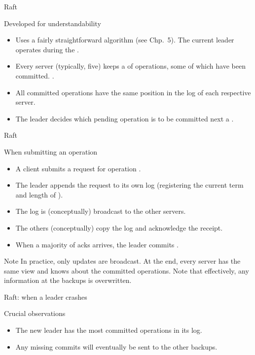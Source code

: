 \begin{slide}{Raft}
  \begin{block}{Developed for understandability}
    \begin{itemize}
    \item Uses a fairly straightforward  algorithm (see Chp.~5). The current leader
      operates during the  .
    \item Every server (typically, five) keeps a  of operations, some of which have been
      committed. .
    \item All committed operations have the same position in the log of each respective server.
    \item The leader decides which pending operation is to be committed next \mathexpr{\Rightarrow} a
      .
    \end{itemize}
  \end{block}
\end{slide}
\begin{slide}{Raft}
  \begin{block}{When submitting an operation}
    \begin{itemize}
    \item A client submits a request for operation .
    \item The leader appends the request  to its own log
      (registering the current term  and length of ).
    \item The log is (conceptually) broadcast to the other servers.
    \item The others (conceptually) copy the log and acknowledge the receipt.
    \item When a majority of acks arrives, the leader commits .
    \end{itemize}
  \end{block}

  \onslide
  \begin{alertblock}{Note}
    In practice, only updates are broadcast. At the end, every server has the same view and knows about the
     committed operations. Note that effectively, any information at the backups is overwritten.
  \end{alertblock}
\end{slide}
\begin{slide}{Raft: when a leader crashes}
  \begin{centerfig}
  \end{centerfig}
  \begin{alertblock}{Crucial observations}
    \begin{itemize}
    \item The new leader has the most committed operations in its log.
    \item Any missing commits will eventually be sent to the other backups.
    \end{itemize}
  \end{alertblock}
\end{slide}
